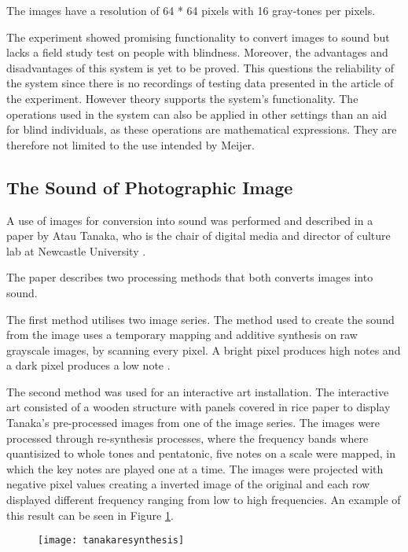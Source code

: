 The images have a resolution of 64 * 64 pixels with 16 gray-tones per pixels.  

The experiment showed promising functionality to convert images to sound but lacks a field study test on people with blindness. Moreover, the advantages and disadvantages of this system is yet to be proved. This questions the reliability of the system since there is no recordings of testing data presented in the article of the experiment. However theory supports the system's functionality. The operations used in the system can also be applied in other settings than an aid for blind individuals, as these operations are mathematical expressions. They are therefore not limited to the use intended by Meijer.

\subsection{The Sound of Photographic Image}\label{sec:soundarticle}

A use of images for conversion into sound was performed and described in a paper by Atau Tanaka, who is the chair of digital media and director of culture lab at Newcastle University \cite{Tanaka2012}.

The paper describes two processing methods that both converts images into sound.

The first method utilises two image series. The method used to create the sound from the image uses a temporary mapping and additive synthesis on raw grayscale images, by scanning every pixel. A bright pixel produces high notes and a dark pixel produces a low note \cite{Tanaka2012}.

The second method was used for an interactive art installation. The interactive art consisted of a wooden structure with panels covered in rice paper to display Tanaka's pre-processed images from one of the image series. The images were processed through re-synthesis processes, where the frequency bands where quantisized to whole tones and pentatonic, five notes on a scale were mapped, in which the key notes are played one at a time.  The images were projected with negative pixel values creating a inverted image of the original and each row displayed different frequency ranging from low to high frequencies. An example of this result can be seen in Figure \ref{fig:tanakaresynthesis}.  

\begin{figure}[!h]
\centering
\texttt{[image: tanakaresynthesis]}
\caption{\label{fig:tanakaresynthesis}\cite{Tanaka2012}}
\end{figure}

